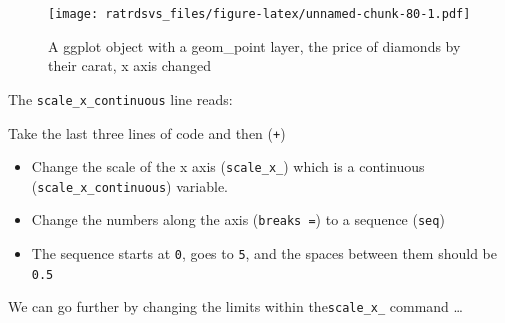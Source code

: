 \documentclass[
]{book}
\newenvironment{Shaded}{\begin{snugshade}}{\end{snugshade}}
\newcommand{\DataTypeTok}[1]{\textcolor[rgb]{0.13,0.29,0.53}{#1}}
\newcommand{\DecValTok}[1]{\textcolor[rgb]{0.00,0.00,0.81}{#1}}
\newcommand{\FloatTok}[1]{\textcolor[rgb]{0.00,0.00,0.81}{#1}}
\newcommand{\KeywordTok}[1]{\textcolor[rgb]{0.13,0.29,0.53}{\textbf{#1}}}
\newcommand{\NormalTok}[1]{#1}
\newcommand{\OperatorTok}[1]{\textcolor[rgb]{0.81,0.36,0.00}{\textbf{#1}}}
\newcommand{\StringTok}[1]{\textcolor[rgb]{0.31,0.60,0.02}{#1}}
\begin{document}
\begin{Shaded}
\end{Shaded}

\begin{figure}
\centering
\texttt{[image: ratrdsvs\_files/figure-latex/unnamed-chunk-80-1.pdf]}
\caption{\label{fig:unnamed-chunk-80}A ggplot object with a geom\_point layer, the price of diamonds by their carat, x axis changed}
\end{figure}

The \texttt{scale\_x\_continuous} line reads:

\begin{translate}
Take the last three lines of code and then (\texttt{+})

\begin{itemize}
\item
  Change the scale of the x axis (\texttt{scale\_x\_}) which is a
  continuous (\texttt{scale\_x\_continuous}) variable.
\item
  Change the numbers along the axis (\texttt{breaks\ =}) to a sequence
  (\texttt{seq})
\item
  The sequence starts at \texttt{0}, goes to \texttt{5}, and the spaces
  between them should be \texttt{0.5}
\end{itemize}
\end{translate}

We can go further by changing the limits within the\texttt{scale\_x\_} command \ldots{}

\begin{Shaded}
\end{Shaded}
\end{document}

